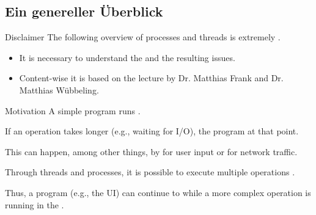 \documentclass[12pt, aspectratio=169, usepdftitle=false, handout]{beamer}
\begin{document}
\titlepage







\subsection{Ein genereller Überblick}

\begin{frame}[fragile]{Disclaimer}
        The following overview of processes and threads is extremely . 
	\pause
	
	\medskip
	
	\begin{itemize}
		\item It is necessary to understand the  and the resulting issues.
		\pause
		\item Content-wise it is based on the lecture  by\newline
		 Dr. Matthias Frank and Dr. Matthias Wübbeling.
	\end{itemize}

\end{frame}



\begin{frame}[fragile]{Motivation}
    	 A simple program runs .
	
		\medskip
		
		If an operation takes longer (e.g., waiting for I/O), the program  at that point.
		
		\medskip
		
		This can happen, among other things, by  for user input or for network traffic.
		
		\medskip
		
		Through threads and processes, it is possible to execute multiple operations .
		
		\medskip
		
		Thus, a program (e.g., the UI) can continue to  while a more complex operation is running in the .
		
\end{frame}
\end{document}
